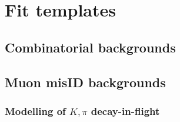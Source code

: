 \section{Fit templates}
\label{ref:fit:tmpl}


\subsection{Combinatorial backgrounds}
\label{ref:fit:tmpl:comb}


\subsection{Muon misID backgrounds}
\label{ref:fit:tmpl:misid}


\subsubsection{Modelling of $K, \pi$ decay-in-flight}
\label{ref:fit:tmpl:misid:dif}

